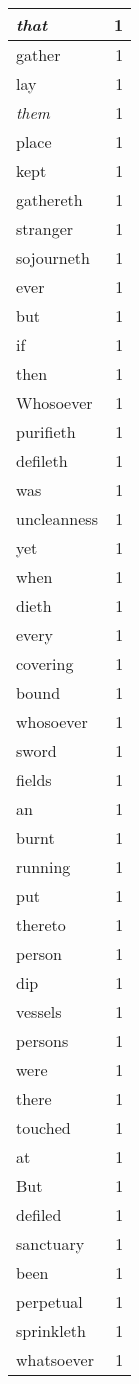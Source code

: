\begin{center}
\begin{longtable}{l|r}
\emph{that} & 1 \\ \hline
gather & 1 \\ \hline
lay & 1 \\ \hline
\emph{them} & 1 \\ \hline
place & 1 \\ \hline
kept & 1 \\ \hline
gathereth & 1 \\ \hline
stranger & 1 \\ \hline
sojourneth & 1 \\ \hline
ever & 1 \\ \hline
but & 1 \\ \hline
if & 1 \\ \hline
then & 1 \\ \hline
Whosoever & 1 \\ \hline
purifieth & 1 \\ \hline
defileth & 1 \\ \hline
was & 1 \\ \hline
uncleanness & 1 \\ \hline
yet & 1 \\ \hline
when & 1 \\ \hline
dieth & 1 \\ \hline
every & 1 \\ \hline
covering & 1 \\ \hline
bound & 1 \\ \hline
whosoever & 1 \\ \hline
sword & 1 \\ \hline
fields & 1 \\ \hline
an & 1 \\ \hline
burnt & 1 \\ \hline
running & 1 \\ \hline
put & 1 \\ \hline
thereto & 1 \\ \hline
person & 1 \\ \hline
dip & 1 \\ \hline
vessels & 1 \\ \hline
persons & 1 \\ \hline
were & 1 \\ \hline
there & 1 \\ \hline
touched & 1 \\ \hline
at & 1 \\ \hline
But & 1 \\ \hline
defiled & 1 \\ \hline
sanctuary & 1 \\ \hline
been & 1 \\ \hline
perpetual & 1 \\ \hline
sprinkleth & 1 \\ \hline
whatsoever & 1 \\ \hline
\end{longtable}
\end{center}



